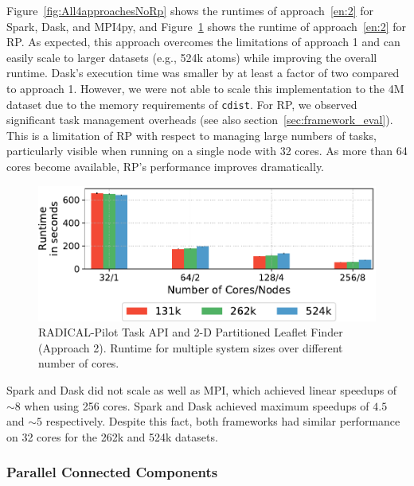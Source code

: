 Figure~\ref{fig:All4approachesNoRp} shows the runtimes of approach~\ref{en:2}
for Spark, Dask, and MPI4py, and Figure~\ref{fig:rpLF} shows the runtime of
approach~\ref{en:2} for RP. As expected, this approach overcomes the
limitations of approach 1 and can easily scale to larger datasets (e.g., 524k
atoms) while improving the overall runtime. Dask's execution time was smaller by
at least a factor of two compared to
approach 1. However, we were not able to scale this implementation to the 4M
dataset due to the memory requirements of \texttt{cdist}. For RP, we
observed significant task management overheads (see also
section~\ref{sec:framework_eval}). This is a limitation of RP with
respect to managing large numbers of tasks, particularly visible when running on
a single node with 32 cores. As more than 64 cores become available,
RP's performance improves dramatically.

\begin{figure}[t]
    \centering
    \includegraphics[width=.75\textwidth]{figures/data_analytics_hpc/task_par/rpLF.pdf}
    \caption{RADICAL-Pilot Task API and 2-D Partitioned Leaflet Finder (Approach
    2). Runtime for multiple system sizes over different number of cores.}
    \label{fig:rpLF}
\end{figure}

Spark and Dask did not scale as well as MPI, which achieved linear speedups of
$\sim8$ when using 256 cores. Spark and Dask achieved maximum speedups of
$4.5$ and $\sim5$ respectively. Despite this fact, both frameworks had similar
performance on 32 cores for the 262k and 524k datasets.

\subsubsection*{Parallel Connected Components}

